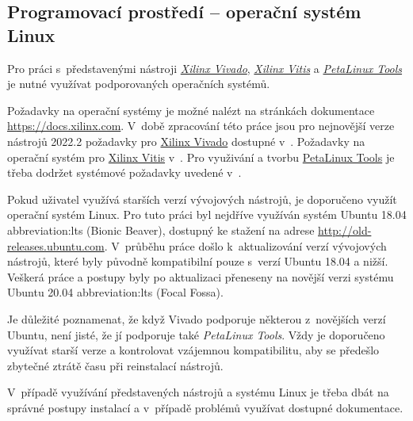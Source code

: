 \documentclass[a4paper, twoside, 11pt]{article}
\begin{document}
		\subsection{Programovací prostředí – operační systém Linux}
			Pro práci s~představenými nástroji \hyperref[subsec:xilinx-vivado]{\textit{Xilinx Vivado}}, \hyperref[subsec:xilinx-vitis]{\textit{Xilinx Vitis}} a \hyperref[subsec:petalinux-tools]{\textit{PetaLinux Tools}} je nutné využívat podporovaných operačních systémů.\par
			Požadavky na operační systémy je možné nalézt na stránkách dokumentace \href{https://docs.xilinx.com}{\textcolor{ctublue}{https://docs.xilinx.com}}. V~době zpracování této práce jsou pro nejnovější verze nástrojů 2022.2 požadavky pro \hyperref[subsec:xilinx-vivado]{Xilinx Vivado} dostupné v~\cite{xilinx-vivado-design-suite-user-guide-2022}. Požadavky na operační systém pro \hyperref[subsec:xilinx-vitis]{Xilinx Vitis} v~\cite{vitis-unified-software-platform-documentation-2022}. Pro využivání a tvorbu \hyperref[subsec:petalinux-tools]{PetaLinux Tools} je třeba dodržet systémové požadavky uvedené v~\cite{petalinux-tools-documentation-2022}.\par
			Pokud uživatel využívá starších verzí vývojových nástrojů, je doporučeno využít operační systém Linux. Pro tuto práci byl nejdříve využíván systém Ubuntu 18.04 \gls{abbreviation:lts} (Bionic Beaver), dostupný ke stažení na adrese \href{http://old-releases.ubuntu.com}{\textcolor{ctublue}{http://old-releases.ubuntu.com}}. V~průběhu práce došlo k~aktualizování verzí vývojových nástrojů, které byly původně kompatibilní pouze s~verzí Ubuntu 18.04 a nižší. Veškerá práce a postupy byly po aktualizaci přeneseny na novější verzi systému Ubuntu 20.04 \gls{abbreviation:lts} (Focal Fossa).\par
			Je důležité poznamenat, že když Vivado podporuje některou z~novějších verzí Ubuntu, není jisté, že jí podporuje také \textit{PetaLinux Tools}. Vždy je doporučeno využívat starší verze a kontrolovat vzájemnou kompatibilitu, aby se předešlo zbytečné ztrátě času při reinstalací nástrojů.\par
			V~případě využívání představených nástrojů a systému Linux je třeba dbát na správné postupy instalací a v~případě problémů využívat dostupné dokumentace.
\end{document}
